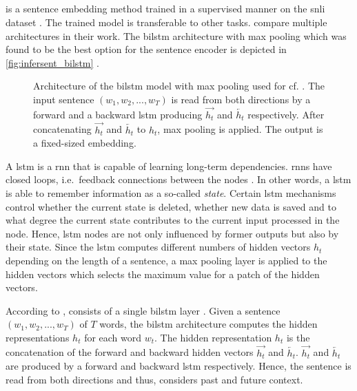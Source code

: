 \subsection{\infersent{}}\label{subsec:inferSent}

\infersent{} is a sentence embedding method trained in a supervised manner on the \ac{snli} dataset \cite{inferSent2018, HfsentTrans2019}.
The trained model is transferable to other tasks.
\citeauthor{inferSent2018} compare multiple architectures in their work.
The \ac{bilstm} architecture with max pooling which was found to be the best option for the sentence encoder 
is depicted in \autoref{fig:infersent_bilstm} \cite{inferSent2018}.

\begin{figure}[!htb] %
    \centering
    
    \caption[Architecture of \infersent{}]{Architecture of the \acs*{bilstm} model with max pooling used for \infersent{} cf. \cite{inferSent2018}.
    The input sentence $(w_1, w_2, ..., w_T)$ is read from both directions by a forward and a backward \acs*{lstm} 
    producing $\overrightarrow{h_t}$ and $\overleftarrow{h_t}$ respectively.
    After concatenating $\overrightarrow{h_t}$ and $\overleftarrow{h_t}$ to $h_t$, max pooling is applied.
    The output is a fixed-sized embedding.
    }
    \label{fig:infersent_bilstm}
\end{figure}

A \ac{lstm} is a \ac{rnn} that is capable of learning long-term dependencies.
\acp{rnn} have closed loops, i.e.\ feedback connections between the nodes \cite{rnn_book2001}.
In other words, 
a \ac{lstm} is able to remember information as a so-called \textit{state}.
Certain \ac{lstm} mechanisms control whether the current state is deleted, whether new data is saved and 
to what degree the current state contributes to the current input processed in the node.
Hence, \ac{lstm} nodes are not only influenced by former outputs but also by their state.
Since the \ac{lstm} computes different numbers of hidden vectors $h_t$ depending on the length of a sentence, 
a max pooling layer is applied to the hidden vectors which selects the maximum value for a patch of the hidden vectors.

According to \citeauthor{HfsentTrans2019}, \infersent{} consists of a single \ac{bilstm} layer \cite{HfsentTrans2019}.
Given a sentence $(w_1, w_2, ..., w_T)$ of $T$ words, the \ac{bilstm} architecture computes the hidden representations $h_t$ for each word $w_t$.
The hidden representation $h_t$ is the concatenation of the forward and backward hidden vectors $\overrightarrow{h_t}$ and $\overleftarrow{h_t}$.
$\overrightarrow{h_t}$ and $\overleftarrow{h_t}$ are produced by a forward and backward \ac{lstm} respectively.
Hence, the sentence is read from both directions and thus, considers past and future context.